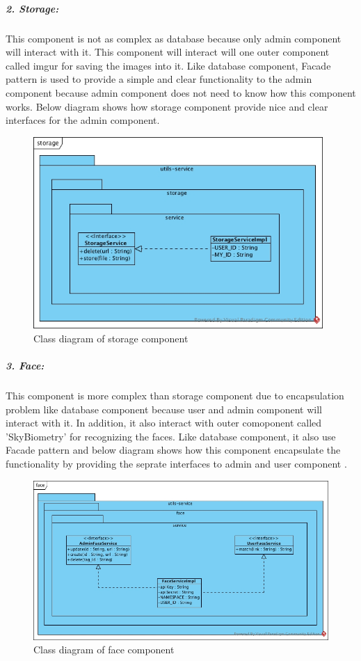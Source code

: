 \documentclass[a4paper,11pt]{article}
\begin{document}
\newpage
\subparagraph{2. Storage: }This component is not as complex as database because only admin component will interact with it. This component will interact will one outer component called imgur for saving the images into it. Like database component, Facade pattern is used to provide a simple and clear functionality to the admin component because admin component does not need to know how this component works. Below diagram shows how storage component provide nice and clear interfaces for the admin component.

\begin{figure}[ht!]
    \centering
	\includegraphics[width=110mm]{ClassDiagrams/new/storage.jpg}
	\caption{Class diagram of storage component}
\end{figure}

\subparagraph{3. Face: }This component is more complex than storage component due to encapsulation problem like database component because user and admin component will interact with it. In addition, it also interact with outer comoponent called 'SkyBiometry' for recognizing the faces. Like database component, it also use Facade pattern and below diagram shows how this component encapsulate the functionality by providing the seprate interfaces to admin and user component .

\begin{figure}[ht!]
    \centering
	\includegraphics[width=125mm]{ClassDiagrams/new/face.jpg}
	\caption{Class diagram of face component}
\end{figure}
\end{document}
